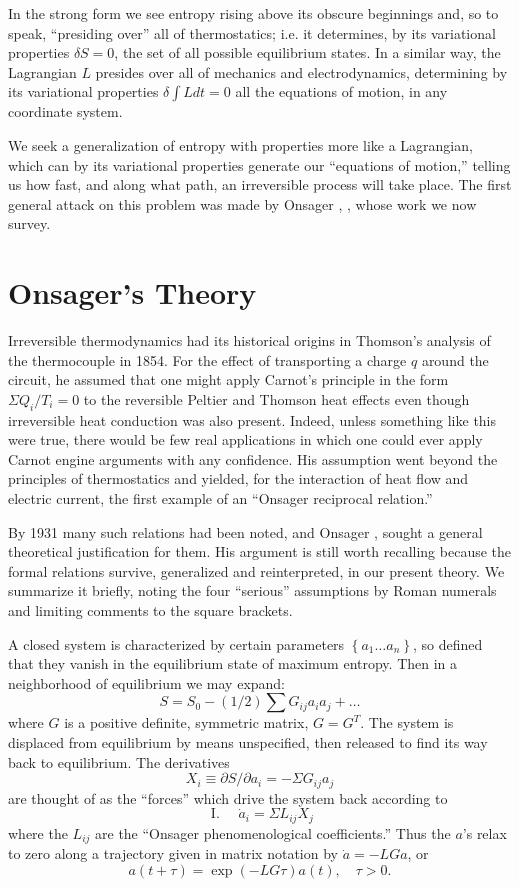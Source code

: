 \documentclass{article}
\begin{document}
In the strong form we see entropy rising above its obscure beginnings and, so to speak, ``presiding over'' all of thermostatics; i.e. it determines, by its variational properties $\delta S=0$, the set of all possible equilibrium states. In a similar way, the Lagrangian $L$ presides over all of mechanics and electrodynamics, determining by its variational properties $\delta \int L d t=0$ all the equations of motion, in any coordinate system.

We seek a generalization of entropy with properties more like a Lagrangian, which can by its variational properties generate our ``equations of motion,'' telling us how fast, and along what path, an irreversible process will take place. The first general attack on this problem was made by Onsager \cite{onsager1931a}, \cite{onsager1931b}, whose work we now survey.

\section{Onsager's Theory}

Irreversible thermodynamics had its historical origins in Thomson's analysis of the thermocouple in 1854. For the effect of transporting a charge $q$ around the circuit, he assumed that one might apply Carnot's principle in the form $\Sigma Q_i / T_i=0$ to the reversible Peltier and Thomson heat effects even though irreversible heat conduction was also present. Indeed, unless something like this were true, there would be few real applications in which one could ever apply Carnot engine arguments with any confidence. His assumption went beyond the principles of thermostatics and yielded, for the interaction of heat flow and electric current, the first example of an ``Onsager reciprocal relation.''

By 1931 many such relations had been noted, and Onsager \cite{onsager1931a}, \cite{onsager1931b} sought a general theoretical justification for them. His argument is still worth recalling because the formal relations survive, generalized and reinterpreted, in our present theory. We summarize it briefly, noting the four ``serious'' assumptions by Roman numerals and limiting comments to the square brackets.

A closed system is characterized by certain parameters $\left\{a_1 \ldots a_n\right\}$, so defined that they vanish in the equilibrium state of maximum entropy. Then in a neighborhood of equilibrium we may expand:
$$
S=S_0-(1 / 2) \sum G_{i j} a_i a_j+\ldots
$$
where $G$ is a positive definite, symmetric matrix, $G=G^T$. The system is displaced from equilibrium by means unspecified, then released to find its way back to equilibrium. The derivatives
$$
X_i \equiv \partial S / \partial a_i=-\Sigma G_{i j} a_j
$$
are thought of as the ``forces'' which drive the system back according to
$$
\text { I. } \quad \dot{a}_i=\Sigma L_{i j} X_j
$$
where the $L_{i j}$ are the ``Onsager phenomenological coefficients.'' Thus the $a$'s relax to zero along a trajectory given in matrix notation by $\dot{a}=-L G a$, or
$$
a(t+\tau)=\exp (-L G \tau) a(t), \quad \tau>0 .
$$
\end{document}
